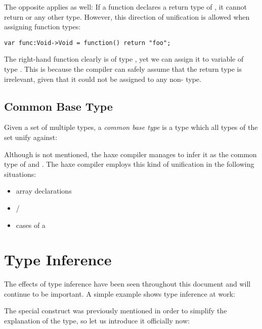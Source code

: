 \documentclass{haxe}
\begin{document}
The opposite applies as well: If a function declares a return type of , it cannot return  or any other type. However, this direction of unification is allowed when assigning function types:

\begin{lstlisting}
var func:Void->Void = function() return "foo";
\end{lstlisting}
The right-hand function clearly is of type , yet we can assign it to variable  of type . This is because the compiler can safely assume that the return type is irrelevant, given that it could not be assigned to any non- type.


\subsection{Common Base Type}
\label{type-system-unification-common-base-type}

Given a set of multiple types, a \emph{common base type} is a type which all types of the set unify against:

Although  is not mentioned, the haxe compiler manages to infer it as the common type of  and . The haxe compiler employs this kind of unification in the following situations:

\begin{itemize}
	\item array declarations
	\item {}/
	\item cases of a 
\end{itemize}




\section{Type Inference}
\label{type-system-type-inference}

The effects of type inference have been seen throughout this document and will continue to be important. A simple example shows type inference at work:

The special construct  was previously mentioned in order to simplify the explanation of the  type, so let us introduce it officially now:

\end{document}
